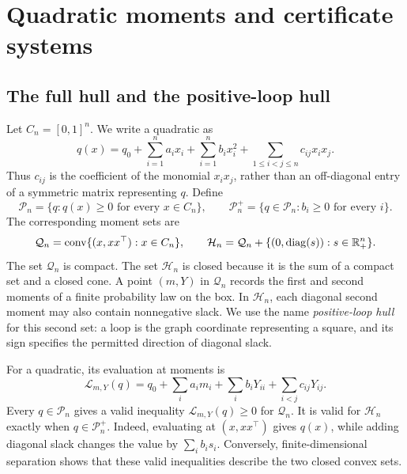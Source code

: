 \section{Quadratic moments and certificate systems}\label{sec:setting}

\subsection{The full hull and the positive-loop hull}\label{set:cones}
Let $C_n=[0,1]^n$. We write a quadratic as
\begin{equation}\label{eq:set:quadratic}
 q(x)=q_0+\sum_{i=1}^n a_ix_i+\sum_{i=1}^n b_ix_i^2
                  +\sum_{1\le i<j\le n}c_{ij}x_ix_j.
\end{equation}
Thus $c_{ij}$ is the coefficient of the monomial $x_ix_j$, rather than an
off-diagonal entry of a symmetric matrix representing $q$. Define
\[
 \mathcal P_n=\{q:q(x)\ge0\text{ for every }x\in C_n\},\qquad
 \mathcal P_n^+=\{q\in\mathcal P_n:b_i\ge0\text{ for every }i\}.
\]
The corresponding moment sets are
\begin{equation}\label{eq:set:hulls}
 \mathcal Q_n=\operatorname{conv}\{(x,xx^\top):x\in C_n\},\qquad
 \mathcal H_n=\mathcal Q_n+
       \{(0,\operatorname{diag}(s)):s\in\mathbb R_+^n\}.
\end{equation}
The set $\mathcal Q_n$ is compact. The set $\mathcal H_n$ is closed because
it is the sum of a compact set and a closed cone. A point $(m,Y)$ in
$\mathcal Q_n$ records the first and second moments of a finite probability
law on the box. In $\mathcal H_n$, each diagonal second moment may also
contain nonnegative slack. We use the name \emph{positive-loop hull} for this
second set: a loop is the graph coordinate representing a square, and its
sign specifies the permitted direction of diagonal slack.

For a quadratic, its evaluation at moments is
\begin{equation}\label{eq:set:pairing}
 \mathcal L_{m,Y}(q)=q_0+\sum_i a_im_i+\sum_i b_iY_{ii}
                         +\sum_{i<j}c_{ij}Y_{ij}.
\end{equation}
Every $q\in\mathcal P_n$ gives a valid inequality $\mathcal L_{m,Y}(q)\ge0$ for
$\mathcal Q_n$. It is valid for $\mathcal H_n$ exactly when $q\in\mathcal P_n^+$.
Indeed, evaluating at $(x,xx^\top)$ gives $q(x)$, while adding diagonal
slack changes the value by $\sum_i b_is_i$. Conversely, finite-dimensional
separation shows that these valid inequalities describe the two closed
convex sets.

